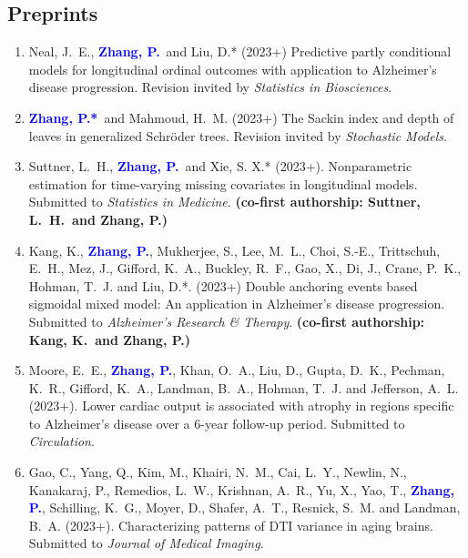 \documentclass[12pt]{article}
\newcommand{\PZ}{\textcolor{blue}{\textbf{Zhang, P.*}}}
\newcommand{\PZnot}{\textcolor{blue}{\textbf{Zhang, P.}}}
\begin{document}
	\subsection*{Preprints}
	\begin{enumerate}	
		\item {\sc Neal, J.\ E.}, \PZnot\ and {\sc Liu, D.*} (2023+) 
		Predictive partly conditional models for longitudinal 
		ordinal outcomes with application to Alzheimer's disease
		progression. Revision invited by {\em Statistics in 
		Biosciences}.
		
		\item \PZ\ and {\sc Mahmoud, H.\ M.} (2023+) The Sackin 
		index 
		and depth of leaves in generalized Schr\"{o}der trees. 
		Revision invited by {\em Stochastic Models}.
				
		\item {\sc Suttner, L.\ H.,} \PZnot\ and {\sc Xie, S. X.*} 
		(2023+). Nonparametric estimation for time-varying missing 
		covariates in longitudinal models. Submitted to {\em 
		Statistics in Medicine}. {\bf (co-first authorship: Suttner, 
		L.\ H.\ and Zhang, P.)}
	
		\item {\sc Kang, K.}, \PZnot, {\sc Mukherjee, S., Lee, M.\ 
		L., Choi, S.-E., Trittschuh, E.\ H., Mez, J., Gifford, K.\ 
		A., Buckley, R.\ F., Gao, X., Di, J., Crane, P.\ K., Hohman, 
		T.\ J.} and {\sc Liu, D.*}. (2023+) Double anchoring events 
		based sigmoidal mixed model: An application in Alzheimer's 
		disease progression. Submitted to {\em Alzheimer's Research 
		\& Therapy}. {\bf (co-first authorship: Kang, K.\ and Zhang, 
		P.)}
		
		\item {\sc Moore, E.\ E.,} \PZnot, {\sc Khan, O.\ A., Liu, 
		D., Gupta, D.\ K., Pechman, K.\ R., Gifford, K.\ A., 
		Landman, B.\ A., Hohman, T.\ J.} and {\sc Jefferson, A.\ 
		L.} (2023+). Lower cardiac output is associated with atrophy 
		in regions specific to Alzheimer’s disease over a 6-year 
		follow-up period. Submitted to {\em Circulation}.
		
		\item {\sc Gao, C., Yang, Q., Kim, M., Khairi, N.\ M., Cai, 
		L.\ Y., Newlin, N., Kanakaraj, P., Remedios, L.\ W., 
		Krishnan, A.\ R., Yu, X., Yao, T.,} \PZnot, {\sc Schilling, 
		K.\ G., Moyer, D., Shafer, A.\ T., Resnick, S.\ M.} and {\sc 
		Landman, B.\ A.} (2023+). Characterizing patterns of DTI 
		variance in aging brains. Submitted to {\em Journal of 
		Medical Imaging}.
	\end{enumerate}
	
\end{document}
